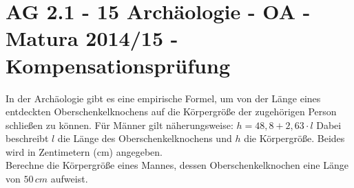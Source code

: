 \section{AG 2.1 - 15 Archäologie - OA - Matura 2014/15 - Kompensationsprüfung}

\begin{beispiel}[AG 2.1]{1} %
				In der Archäologie gibt es eine empirische Formel, um von der Länge eines entdeckten Oberschenkelknochens auf die Körpergröße der zugehörigen Person schließen zu können.
				Für Männer gilt näherungsweise: $h=48,8+2,63\cdot l$
				Dabei beschreibt $l$ die Länge des Oberschenkelknochens und $h$ die Körpergröße. Beides wird in Zentimetern (cm) angegeben.\\
				
				Berechne die Körpergröße eines Mannes, dessen Oberschenkelknochen eine Länge von $50\,cm$ aufweist.\\
				
\end{beispiel}